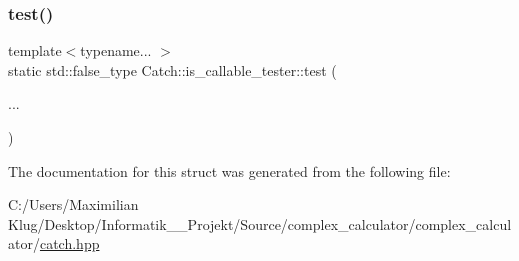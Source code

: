 \mbox{\label{struct_catch_1_1is__callable__tester_adce16c4accb860bf46f6491dd70cfd63}} 
\subsubsection{\texorpdfstring{test()}{test()}\hspace{0.1cm}{\footnotesize\ttfamily [2/2]}}
{\footnotesize\ttfamily template$<$typename... $>$ \\
static std\+::false\+\_\+type Catch\+::is\+\_\+callable\+\_\+tester\+::test (\begin{DoxyParamCaption}\item[{}]{... }\end{DoxyParamCaption})\hspace{0.3cm}{\ttfamily [static]}}



The documentation for this struct was generated from the following file\+:\begin{DoxyCompactItemize}
\item 
C\+:/\+Users/\+Maximilian Klug/\+Desktop/\+Informatik\+\_\+\_\+\+Projekt/\+Source/complex\+\_\+calculator/complex\+\_\+calculator/\mbox{\hyperlink{catch_8hpp}{catch.\+hpp}}\end{DoxyCompactItemize}
